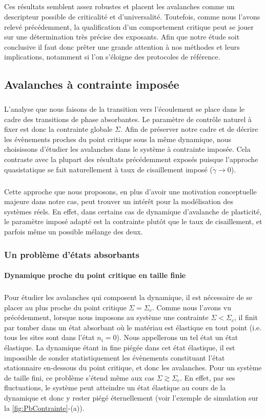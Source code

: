 \subparagraph{}Ces résultats semblent assez robustes et placent les avalanches comme un descripteur possible de criticalité et d'universalité. Toutefois, comme nous l'avons relevé précédemment, la qualification d'un comportement critique peut se jouer sur une détermination très précise des exposants. Afin que notre étude soit conclusive il faut donc prêter une grande attention à nos méthodes et leurs implications, notamment si l'on s'éloigne des protocoles de référence.

\subsection{Avalanches à contrainte imposée}

\subparagraph{}L'analyse que nous faisons de la transition vers l'écoulement se place dans le cadre des transitions de phase absorbantes. Le paramètre de contrôle naturel à fixer est donc la contrainte globale $\Sigma$. Afin de préserver notre cadre et de décrire les évènements proches du point critique sous la même dynamique, nous choisissons d'étudier les avalanches dans le système à contrainte imposée. Cela contraste avec la plupart des résultats précédemment exposés puisque l'approche quasistatique se fait naturellement à taux de cisaillement imposé ($\dot{\gamma}\rightarrow 0$).

\subparagraph{}Cette approche que nous proposons, en plus d'avoir une motivation conceptuelle majeure dans notre cas, peut trouver un intérêt pour la modélisation des systèmes réels. En effet, dans certains cas de dynamique d'avalanche de plasticité, le paramètre imposé adapté est la contrainte plutôt que le taux de cisaillement, et parfois même un possible mélange des deux.

\subsubsection{Un problème d'états absorbants}

\paragraph{Dynamique proche du point critique en taille finie}

\subparagraph{}Pour étudier les avalanches qui composent la dynamique, il est nécessaire de se placer au plus proche du point critique $\Sigma = \Sigma_c$. Comme nous l'avons vu précédemment, lorsque nous imposons au système une contrainte $\Sigma < \Sigma_c$, il finit par tomber dans un état absorbant où le matériau est élastique en tout point (i.e. tous les sites sont dans l'état $n_i = 0$). Nous appellerons un tel état un état élastique. La dynamique étant in fine piégée dans cet état élastique, il est impossible de sonder statistiquement les évènements constituant l'état stationnaire en-dessous du point critique, et donc les avalanches. Pour un système de taille fini, ce problème s'étend même aux cas $\Sigma \gtrsim \Sigma_c$. En effet, par ses fluctuations, le système peut atteindre un état élastique au cours de la dynamique et donc y rester piégé éternellement (voir l'exemple de simulation sur la \autoref{fig:PbContrainte}-(a)).

